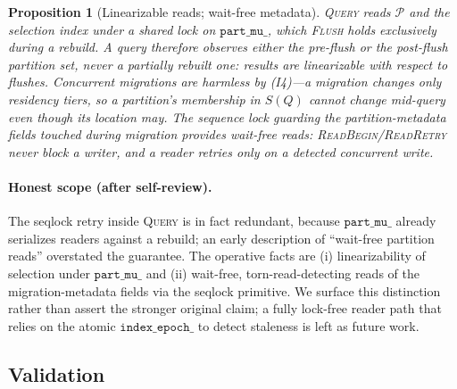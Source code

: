 \documentclass[10pt]{article}
\newtheorem{proposition}{Proposition}
\theoremstyle{definition}
\begin{document}
\begin{proposition}[Linearizable reads; wait-free metadata]
\label{prop:read}
\textsc{Query} reads $\mathcal{P}$ and the selection index under a shared lock on
$\texttt{part\_mu\_}$, which \textsc{Flush} holds exclusively during a rebuild.
A query therefore observes either the pre-flush or the post-flush partition set,
never a partially rebuilt one: results are linearizable with respect to flushes.
Concurrent migrations are harmless by (I4)---a migration changes only residency
tiers, so a partition's membership in $S(Q)$ cannot change mid-query even though
its location may. The sequence lock guarding the partition-metadata fields touched
during migration provides wait-free reads: \textsc{ReadBegin}/\textsc{ReadRetry}
never block a writer, and a reader retries only on a detected concurrent write.
\end{proposition}

\paragraph{Honest scope (after self-review).}
The seqlock retry inside \textsc{Query} is in fact redundant, because
$\texttt{part\_mu\_}$ already serializes readers against a rebuild; an early
description of ``wait-free partition reads'' overstated the guarantee. The
operative facts are (i) linearizability of selection under $\texttt{part\_mu\_}$
and (ii) wait-free, torn-read-detecting reads of the migration-metadata fields via
the seqlock primitive. We surface this distinction rather than assert the stronger
original claim; a fully lock-free reader path that relies on the atomic
$\texttt{index\_epoch\_}$ to detect staleness is left as future work.

\subsection{Validation}
\label{sec:validation}
\end{document}

